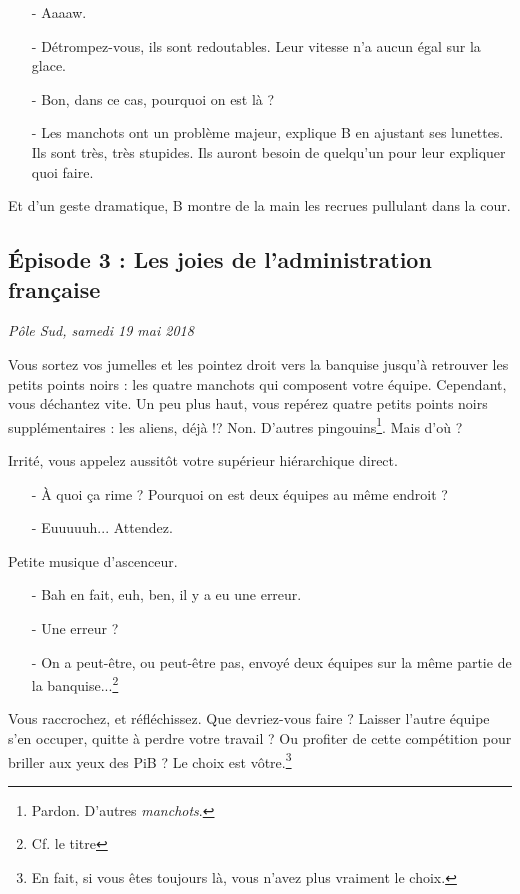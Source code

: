 \begin{itemize}
    \item[-] Aaaaw.
    \item[-] Détrompez-vous, ils sont redoutables. Leur vitesse n'a aucun égal
        sur la glace.
    \item[-] Bon, dans ce cas, pourquoi on est là ?
    \item[-] Les manchots ont un problème majeur, explique B en ajustant ses
        lunettes. Ils sont très, très stupides. Ils auront besoin de quelqu'un
        pour leur expliquer quoi faire.
\end{itemize}

Et d'un geste dramatique, B montre de la main les recrues pullulant dans la
cour.

\newpage
\subsection{Épisode 3 : Les joies de l'administration française}
\hfill \textit{Pôle Sud, samedi 19 mai 2018}

Vous sortez vos jumelles et les pointez droit vers la banquise jusqu'à retrouver
les petits points noirs : les quatre manchots qui composent votre équipe.
Cependant, vous déchantez vite. Un peu plus haut, vous repérez quatre petits
points noirs supplémentaires : les aliens, déjà !? Non. D'autres
pingouins\footnote{Pardon. D'autres \emph{manchots}.}. Mais d'où ?

Irrité, vous appelez aussitôt votre supérieur hiérarchique direct.

\begin{itemize}
    \item[-] À quoi ça rime ? Pourquoi on est deux équipes au même endroit ?
    \item[-] Euuuuuh... Attendez.
\end{itemize}

Petite musique d'ascenceur.

\begin{itemize}
    \item[-] Bah en fait, euh, ben, il y a eu une erreur.
    \item[-] Une erreur ?
    \item[-] On a peut-être, ou peut-être pas, envoyé deux équipes sur la même
        partie de la banquise...\footnote{Cf. le titre}
\end{itemize}

Vous raccrochez, et réfléchissez. Que devriez-vous faire ? Laisser l'autre
équipe s'en occuper, quitte à perdre votre travail ? Ou profiter de cette
compétition pour briller aux yeux des PiB ? Le choix est vôtre.\footnote{En
fait, si vous êtes toujours là, vous n'avez plus vraiment le choix.}
